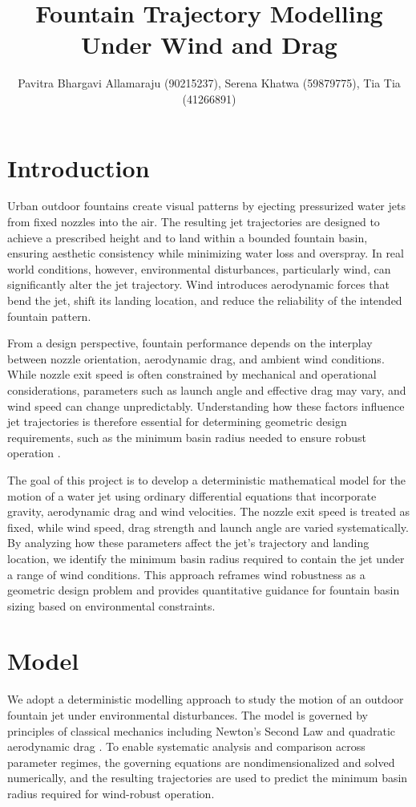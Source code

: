 \documentclass{article}
\title{Fountain Trajectory Modelling Under Wind and Drag}
\author{Pavitra Bhargavi Allamaraju (90215237), Serena Khatwa (59879775), Tia Tia (41266891)}
\begin{document}
\maketitle

\section{Introduction}

Urban outdoor fountains create visual patterns by ejecting pressurized water jets from fixed nozzles into the air. The resulting jet trajectories are designed to achieve a prescribed height and to land within a bounded fountain basin, ensuring aesthetic consistency while minimizing water loss and overspray. In real world conditions, however, environmental disturbances, particularly wind, can significantly alter the jet trajectory. Wind introduces aerodynamic forces that bend the jet, shift its landing location, and reduce the reliability of the intended fountain pattern.

From a design perspective, fountain performance depends on the interplay between nozzle orientation, aerodynamic drag, and ambient wind conditions. While nozzle exit speed is often constrained by mechanical and operational considerations, parameters such as launch angle and effective drag may vary, and wind speed can change unpredictably. Understanding how these factors influence jet trajectories is therefore essential for determining geometric design requirements, such as the minimum basin radius needed to ensure robust operation \cite{wang2024centrifugal}.

The goal of this project is to develop a deterministic mathematical model for the motion of a water jet using ordinary differential equations that incorporate gravity, aerodynamic drag and wind velocities. The nozzle exit speed is treated as fixed, while wind speed, drag strength and launch angle are varied systematically. By analyzing how these parameters affect the jet’s trajectory and landing location, we identify the minimum basin radius required to contain the jet under a range of wind conditions. This approach reframes wind robustness as a geometric design problem and provides quantitative guidance for fountain basin sizing based on environmental constraints.

\section{Model}

We adopt a deterministic modelling approach to study the motion of an outdoor fountain jet under environmental disturbances. The model is governed by principles of classical mechanics including Newton’s Second Law and quadratic aerodynamic drag \cite{lubarda2022review}. To enable systematic analysis and comparison across parameter regimes, the governing equations are nondimensionalized and solved numerically, and the resulting trajectories are used to predict the minimum basin radius required for wind-robust operation.
\end{document}
